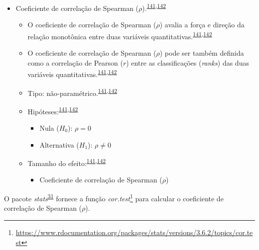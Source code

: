 \documentclass[
  a4paper,
]{book}
\providecommand{\tightlist}{%
  \setlength{\itemsep}{0pt}\setlength{\parskip}{0pt}}
\renewcommand{\href}[2]{#2\footnote{\url{#1}}}
\newenvironment{infobox}[1]
  {
  \begin{itemize}
  \renewcommand{\labelitemi}{
    \raisebox{-.7\height}[0pt][0pt]{
      {\setkeys{Gin}{width=3em,keepaspectratio}
        \texttt{[image: \#1]}}
    }
  }
  \setlength{\fboxsep}{1em}
  \begin{blackbox}
  \item
  }
  {
  \end{blackbox}
  \end{itemize}
  }
\begin{document}
\begin{itemize}
\item
  Coeficiente de correlação de Spearman (\(\rho\)).\textsuperscript{\protect\hyperlink{ref-khamis2008}{141},\protect\hyperlink{ref-allison2022}{142}}

  \begin{itemize}
  \item
    O coeficiente de correlação de Spearman (\(\rho\)) avalia a força e direção da relação monotônica entre duas variáveis quantitativas.\textsuperscript{\protect\hyperlink{ref-khamis2008}{141},\protect\hyperlink{ref-allison2022}{142}}
  \item
    O coeficiente de correlação de Spearman (\(\rho\)) pode ser também definida como a correlação de Pearson (\(r\)) entre as classificações (\emph{ranks}) das duas variáveis quantitativas.\textsuperscript{\protect\hyperlink{ref-khamis2008}{141},\protect\hyperlink{ref-allison2022}{142}}
  \item
    Tipo: não-paramétrico.\textsuperscript{\protect\hyperlink{ref-khamis2008}{141},\protect\hyperlink{ref-allison2022}{142}}
  \item
    Hipóteses:\textsuperscript{\protect\hyperlink{ref-khamis2008}{141},\protect\hyperlink{ref-allison2022}{142}}

    \begin{itemize}
    \item
      Nula (\(H_{0}\)): \(\rho=0\)
    \item
      Alternativa (\(H_{1}\)): \(\rho≠0\)
    \end{itemize}
  \item
    Tamanho do efeito:\textsuperscript{\protect\hyperlink{ref-khamis2008}{141},\protect\hyperlink{ref-allison2022}{142}}

    \begin{itemize}
    \tightlist
    \item
      Coeficiente de correlação de Spearman (\(\rho\))
    \end{itemize}
  \end{itemize}
\end{itemize}

\begin{infobox}{images/Rlogo}
O pacote \emph{stats}\textsuperscript{\protect\hyperlink{ref-stats-2}{31}} fornece a função \href{https://www.rdocumentation.org/packages/stats/versions/3.6.2/topics/cor.test}{\emph{cor.test}} para calcular o coeficiente de correlação de Spearman (\(\rho\)).

\end{infobox}
\end{document}
